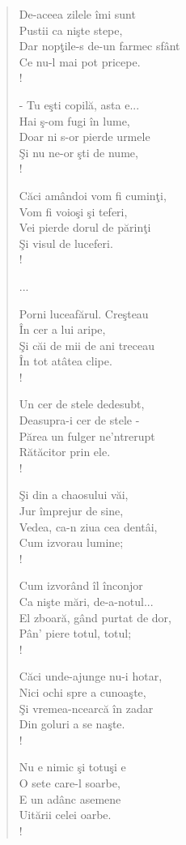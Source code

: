\documentclass{article}
\begin{document}
\begin{small}
\begin{multicols}{3}
\begin{verse}
De-aceea zilele îmi sunt \\
Pustii ca nişte stepe, \\
Dar nopţile-s de-un farmec sfânt \\
Ce nu-l mai pot pricepe. \\!

- Tu eşti copilă, asta e... \\
Hai ş-om fugi în lume, \\
Doar ni s-or pierde urmele \\
Şi nu ne-or şti de nume, \\!

Căci amândoi vom fi cuminţi, \\
Vom fi voioşi şi teferi, \\
Vei pierde dorul de părinţi \\
Şi visul de luceferi. \\!

...

Porni luceafărul. Creşteau \\
În cer a lui aripe, \\
Şi căi de mii de ani treceau \\
În tot atâtea clipe. \\!

Un cer de stele dedesubt, \\
Deasupra-i cer de stele - \\
Părea un fulger ne'ntrerupt \\
Rătăcitor prin ele. \\!

Şi din a chaosului văi, \\
Jur împrejur de sine, \\
Vedea, ca-n ziua cea dentâi, \\
Cum izvorau lumine; \\!

Cum izvorând îl înconjor \\
Ca nişte mări, de-a-notul... \\
El zboară, gând purtat de dor, \\
Pân' piere totul, totul; \\!

Căci unde-ajunge nu-i hotar, \\
Nici ochi spre a cunoaşte, \\
Şi vremea-ncearcă în zadar \\
Din goluri a se naşte. \\!

Nu e nimic şi totuşi e \\
O sete care-l soarbe, \\
E un adânc asemene \\
Uitării celei oarbe. \\!


\end{verse}
\end{multicols}
\end{small}
\end{document}
